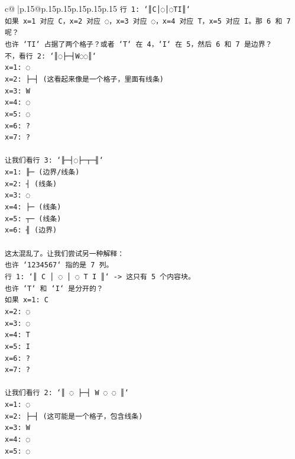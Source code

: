 \documentclass{article}
\begin{document}
{\begin{supertabular}{c@{$\;$}|p{.15\linewidth}@{}p{.15\linewidth}p{.15\linewidth}p{.15\linewidth}p{.15\linewidth}p{.15\linewidth}}
{{{\texttt{行 1: `║C│◌│◌TI║`} \\
\texttt{如果 x=1 对应 C，x=2 对应 ◌，x=3 对应 ◌，x=4 对应 T，x=5 对应 I。那 6 和 7 呢？} \\
\texttt{也许 `TI` 占据了两个格子？或者 `T` 在 4，`I` 在 5，然后 6 和 7 是边界？} \\
\texttt{不，看行 2: `║◌├─┤W◌◌║`} \\
\texttt{x=1: ◌} \\
\texttt{x=2: ├─┤ (这看起来像是一个格子，里面有线条)} \\
\texttt{x=3: W} \\
\texttt{x=4: ◌} \\
\texttt{x=5: ◌} \\
\texttt{x=6: ?} \\
\texttt{x=7: ?} \\
\\ 
\texttt{让我们看行 3: `╟─┤◌├─┬─╢`} \\
\texttt{x=1: ╟─ (边界/线条)} \\
\texttt{x=2: ┤ (线条)} \\
\texttt{x=3: ◌} \\
\texttt{x=4: ├─ (线条)} \\
\texttt{x=5: ┬─ (线条)} \\
\texttt{x=6: ╢ (边界)} \\
\\ 
\texttt{这太混乱了。让我们尝试另一种解释：} \\
\texttt{也许 `1234567` 指的是 7 列。} \\
\texttt{行 1: `║ C │ ◌ │ ◌ T I ║` {-}> 这只有 5 个内容块。} \\
\texttt{也许 `T` 和 `I` 是分开的？} \\
\texttt{如果 x=1: C} \\
\texttt{x=2: ◌} \\
\texttt{x=3: ◌} \\
\texttt{x=4: T} \\
\texttt{x=5: I} \\
\texttt{x=6: ?} \\
\texttt{x=7: ?} \\
\\ 
\texttt{让我们看行 2: `║ ◌ ├─┤ W ◌ ◌ ║`} \\
\texttt{x=1: ◌} \\
\texttt{x=2: ├─┤ (这可能是一个格子，包含线条)} \\
\texttt{x=3: W} \\
\texttt{x=4: ◌} \\
\texttt{x=5: ◌} \\
}}}
\end{supertabular}}
\end{document}
